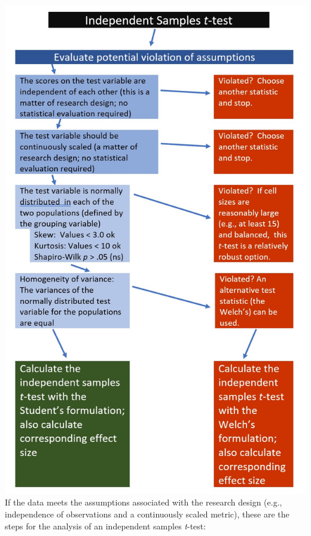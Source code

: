 \documentclass[
  11pt,
]{book}
\begin{document}
\includegraphics{images/ttests/IndSampleWrkFlw.jpg} If the data meets the assumptions associated with the research design (e.g., independence of observations and a continuously scaled metric), these are the steps for the analysis of an independent samples \emph{t}-test:
\end{document}
